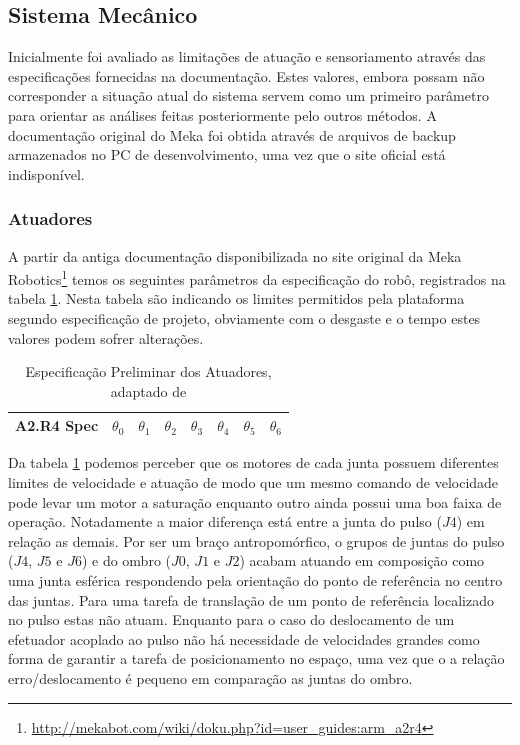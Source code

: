\subsection{Sistema Mecânico}

Inicialmente foi avaliado as limitações de atuação e sensoriamento através das especificações fornecidas na documentação. Estes valores, embora possam não corresponder a situação atual do sistema servem como um primeiro parâmetro para orientar as análises feitas posteriormente pelo outros métodos. A documentação original do Meka foi obtida através de arquivos de backup armazenados no PC de desenvolvimento, uma vez que o site oficial está indisponível.

\subsubsection{Atuadores}

A partir da antiga documentação disponibilizada no site original da Meka Robotics\footnote{\url{http://mekabot.com/wiki/doku.php?id=user_guides:arm_a2r4}} temos os seguintes parâmetros da especificação do robô, registrados na tabela \ref{tab:a2armActuationDoc}. Nesta tabela são indicando os limites permitidos pela plataforma segundo especificação de projeto, obviamente com o desgaste e o tempo estes valores podem sofrer alterações.

\begin{table}[H]
    \centering
    \caption{Especificação Preliminar dos Atuadores, adaptado de \cite{mekaguide}}
    \begin{tabular}{c|ccccccc}
         \hline
         A2.R4 Spec & $\theta_0$ & $\theta_1$ & $\theta_2$ & $\theta_3$ & $\theta_4$ & $\theta_5$ & $\theta_6$\\
         \hline
         
         \hline
    \end{tabular}
    \label{tab:a2armActuationDoc}
\end{table}

Da tabela \ref{tab:a2armActuationDoc} podemos perceber que os motores de cada junta possuem diferentes limites de velocidade e atuação de modo que um mesmo comando de velocidade pode levar um motor a saturação enquanto outro ainda possui uma boa faixa de operação. Notadamente a maior diferença está entre a junta do pulso ($J4$) em relação as demais. Por ser um braço antropomórfico, o grupos de juntas do pulso ($J4$, $J5$ e $J6$) e do ombro ($J0$, $J1$ e $J2$) acabam atuando em composição como uma junta esférica respondendo pela orientação do ponto de referência no centro das juntas. Para uma tarefa de translação de um ponto de referência localizado no pulso estas não atuam. Enquanto para o caso do deslocamento de um efetuador acoplado ao pulso não há necessidade de velocidades grandes como forma de garantir a tarefa de posicionamento no espaço, uma vez que o a relação erro/deslocamento é pequeno em comparação as juntas do ombro.

